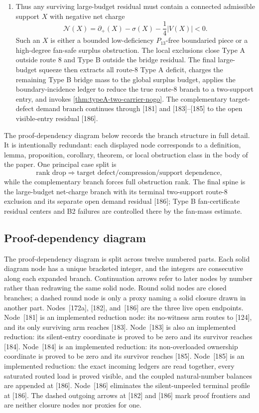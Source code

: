 \documentclass[11pt]{article}
\newcommand{\defp}{\partial_+}
\newcommand{\No}{\mathcal N}
\begin{document}
\begin{enumerate}[label=(\arabic*)]
\[\]
\item Thus any surviving large-budget residual must contain a connected admissible support $X$ with negative net charge
\[
\No(X)=\defp(X)-\sigma(X)-\frac14|V(X)|<0.
\]
Such an $X$ is either a bounded low-deficiency $P_{13}$-free boundaried piece or a
high-degree fan-safe surplus obstruction.  The local exclusions close Type A
outside route 8 and Type B outside the bridge residual.  The final large-budget
squeeze then extracts all route-8 Type A deficit, charges the remaining Type B
bridge mass to the global surplus budget, applies the boundary-incidence ledger to reduce
the true route-8 branch to a two-support entry, and invokes
\cref{thm:typeA-two-carrier-nogo}.  The complementary target-defect demand
branch continues through [181] and [183]--[185] to the open visible-entry
residual [186].
\end{enumerate}


The proof-dependency diagram below records the branch structure in full detail.  It is intentionally redundant: each displayed node corresponds to a definition, lemma, proposition, corollary, theorem, or local obstruction class in the body of the paper.  One principal case split is
\[
\text{rank drop}\Rightarrow\text{target defect/compression/support dependence},
\]
while the complementary branch forces full obstruction rank.  The final spine is
the large-budget net-charge branch with its terminal two-support route-8
exclusion and its separate open demand residual [186]; Type B fan-certificate
residual centers and B2 failures are controlled there by the fan-mass estimate.



\subsection*{Proof-dependency diagram}

The proof-dependency diagram is split across twelve numbered parts.  Each
solid diagram node has a unique bracketed integer, and the integers are consecutive
along each expanded branch.  Continuation arrows refer to later nodes by number rather
than redrawing the same solid node.  Round solid nodes are closed branches; a
dashed round node is only a proxy naming a solid closure drawn in another part.
Nodes~[172a], [182], and~[186] are the three live open endpoints.  Node~[181] is an
implemented reduction node: its no-witness arm routes to [124], and its only
surviving arm reaches [183].  Node~[183] is also an implemented reduction: its
silent-entry coordinate is proved to be zero and its survivor reaches [184].
Node~[184] is an implemented reduction: its non-overloaded ownership
coordinate is proved to be zero and its survivor reaches [185].
Node~[185] is an implemented reduction: the exact incoming ledgers are read
together, every saturated routed load is proved visible, and the coupled
natural-number balances are appended at [186].  Node~[186] eliminates the
silent-unpeeled terminal profile at [186].
The dashed outgoing arrows at [182] and [186]
mark proof frontiers and are neither closure nodes nor proxies for one.
\end{document}
